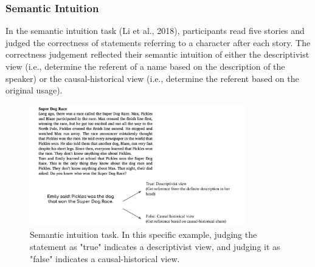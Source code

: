 \documentclass[
  man,floatsintext]{apa6}
\begin{document}
\hypertarget{semantic-intuition-2}{%
\subsubsection{Semantic Intuition}\label{semantic-intuition-2}}

In the semantic intuition task (Li et al., 2018), participants read five stories and judged the correctness of statements referring to a character after each story. The correctness judgement reflected their semantic intuition of either the descriptivist view (i.e., determine the referent of a name based on the description of the speaker) or the causal-historical view (i.e., determine the referent based on the original usage).

\begin{figure}[!h]

{\centering \includegraphics[width=1\linewidth,height=200px]{CCRR_manuscript_files/appendix_task_examples/e2_semantic} 

}

\caption{Semantic intuition task. In this specific example, judging the statement as "true" indicates a descriptivist view, and judging it as "false" indicates a causal-historical view.}\label{fig:semantic}
\end{figure}
\end{document}
